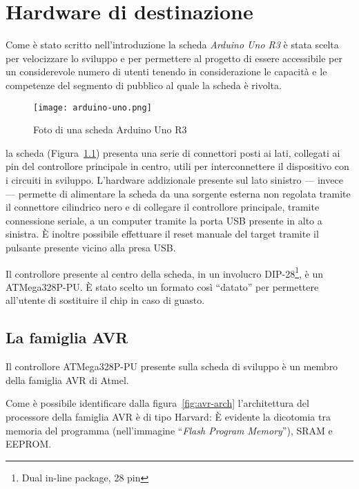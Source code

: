 \chapter{Hardware di destinazione}
    
Come è stato scritto nell'introduzione la scheda \textit{Arduino Uno R3} è stata scelta per velocizzare lo sviluppo e per permettere al progetto di essere accessibile per un considerevole numero di utenti tenendo in considerazione le capacità e le competenze del segmento di pubblico al quale la scheda è rivolta.

\begin{figure}[b]
    \centering
    \texttt{[image: arduino-uno.png]}
    \caption[]{Foto di una scheda Arduino Uno R3\cite{img:arduino-uno-r3}}\label{fig:arduino-uno-r3}
\end{figure}

la scheda (Figura~\ref{fig:arduino-uno-r3}) presenta una serie di connettori posti ai lati, collegati ai pin del controllore principale in centro, utili per interconnettere il dispositivo con i circuiti in sviluppo.
L'hardware addizionale presente sul lato sinistro --- invece --- permette di alimentare la scheda da una sorgente esterna non regolata tramite il connettore cilindrico nero e di collegare il controllore principale, tramite connessione seriale, a un computer tramite la porta USB presente in alto a sinistra.
È inoltre possibile effettuare il reset manuale del target tramite il pulsante presente vicino alla presa USB.\@

Il controllore presente al centro della scheda, in un involucro DIP-28\footnote{Dual in-line package, 28 pin}, è un ATMega328P-PU\cite{site:arduino-uno-doc}. È stato scelto un formato così ``datato'' per permettere all'utente di sostituire il chip in caso di guasto.

\section{La famiglia AVR}

Il controllore ATMega328P-PU presente sulla scheda di sviluppo è un membro della famiglia AVR di Atmel\cite{avr:m328p}.

Come è possibile identificare dalla figura~\ref{fig:avr-arch} l'architettura del processore della famiglia AVR è di tipo Harvard: È evidente la dicotomia tra memoria del programma (nell'immagine ``\textit{Flash Program Memory}''), SRAM e EEPROM\cite{harvard-arch}.

